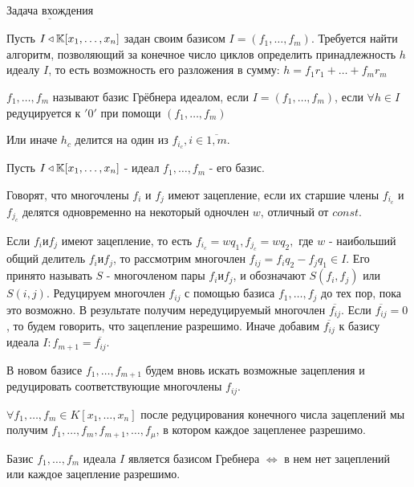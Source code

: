 $\underline{\text{Задача вхождения}}$ 

Пусть $I \triangleleft \mathbb{K}[x_1,\ldots,x_n]$ задан своим базисом $I = (f_1,\ldots,f_m)$. Требуется найти алгоритм, позволяющий за конечное число циклов определить принадлежность $h$ идеалу $I$, то есть возможность его разложения в сумму: $h = f_1r_1 + \ldots + f_mr_m$

\opr $f_1,\ldots,f_m$ называют базис Грёбнера идеалом, если $I = (f_1,\ldots,f_m)$, если $\forall h \in I$ редуцируется к $'0'$ при помощи $(f_1,\dots,f_m)$

Или иначе $h_c$ делится на один из $f_{i_c},i \in \overline{1,m}$.

Пусть $I \triangleleft \mathbb{K}[x_1,\ldots,x_n]$ - идеал $f_1,\ldots,f_m $ - его базис.

\opr Говорят, что многочлены $f_i$ и $f_j$ имеют зацепление, если их старшие члены $f_{i_c}$ и $f_{j_c}$ делятся одновременно на некоторый одночлен $w$, отличный от $const$.

Если $f_i и f_j$ имеют зацепление, то есть $f_{i_c} = wq_1, f_{j_c} = wq_2,$ где $w$ - наибольший общий делитель $f_i и f_j$, то рассмотрим многочлен $f_{ij} = f_iq_2 - f_jq_1 \in I$. Его принято называть $S$ - многочленом пары $f_i и f_j$, и обозначают $S(f_i,f_j)$ или $S(i,j)$. Редуцируем многочлен $f_{ij}$ с помощью базиса $f_1,\ldots,f_j$ до тех пор, пока это возможно. В результате получим нередуцируемый многочлен $\overline{f_{ij}}$. Если $\overline{f_{ij}} = 0$, то будем говорить, что зацепление разрешимо. Иначе добавим $\overline{f_{ij}}$ к базису идеала $I: f_{m+1} = \overline{f_{ij}}$.

В новом базисе $f_1,\ldots,f_{m+1}$ будем вновь искать возможные зацепления и редуцировать соответствующие многочлены $f_{ij}$.

\thr $\forall f_1,\ldots,f_m \in K[x_1,\ldots,x_n]$ после редуцирования конечного числа зацеплений мы получим $f_1,\ldots,f_m,f_{m+1},\ldots,f_\mu$, в котором каждое зацепленее разрешимо.

\thr Базис $f_1,\ldots,f_m$ идеала $I$ является базисом Гребнера $\Leftrightarrow$ в нем нет зацеплений или каждое зацепление разрешимо.

